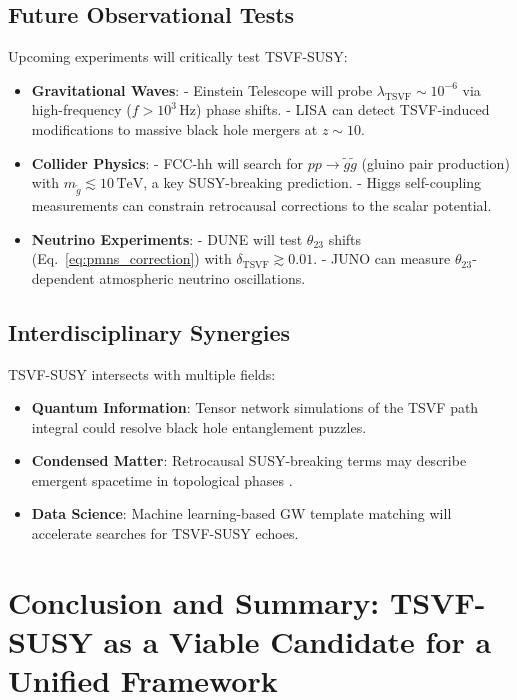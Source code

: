 \documentclass[twocolumn,superscriptaddress,floatfix]{revtex4-2}
\begin{document}
\subsection{Future Observational Tests}  
\label{subsec:future_obs}  

Upcoming experiments will critically test TSVF-SUSY:  
\begin{itemize}  
\item \textbf{Gravitational Waves}:  
  - Einstein Telescope \cite{Punturo2010} will probe \(\lambda_{\text{TSVF}} \sim 10^{-6}\) via high-frequency (\(f > 10^3 \, \text{Hz}\)) phase shifts.  
  - LISA \cite{Amaro-Seoane2017} can detect TSVF-induced modifications to massive black hole mergers at \(z \sim 10\).  
\item \textbf{Collider Physics}:  
  - FCC-hh \cite{Abada2019} will search for \(pp \to \tilde{g}\tilde{g}\) (gluino pair production) with \(m_{\tilde{g}} \lesssim 10 \, \text{TeV}\), a key SUSY-breaking prediction.  
  - Higgs self-coupling measurements \cite{deBlas2020} can constrain retrocausal corrections to the scalar potential.  
\item \textbf{Neutrino Experiments}:  
  - DUNE \cite{Abi2021} will test \(\theta_{23}\) shifts (Eq.~\ref{eq:pmns_correction}) with \(\delta_{\text{TSVF}} \gtrsim 0.01\).  
  - JUNO \cite{An2016} can measure \(\theta_{23}\)-dependent atmospheric neutrino oscillations.  
\end{itemize}  

\subsection{Interdisciplinary Synergies}  
\label{subsec:interdisciplinary}  

TSVF-SUSY intersects with multiple fields:  
\begin{itemize}  
\item \textbf{Quantum Information}: Tensor network simulations \cite{Swingle2012} of the TSVF path integral could resolve black hole entanglement puzzles.  
\item \textbf{Condensed Matter}: Retrocausal SUSY-breaking terms may describe emergent spacetime in topological phases \cite{Vishwanath2015}.  
\item \textbf{Data Science}: Machine learning-based GW template matching \cite{George2018} will accelerate searches for TSVF-SUSY echoes.  
\end{itemize}  

\section{Conclusion and Summary: TSVF-SUSY as a Viable Candidate for a Unified Framework}
\label{sec:conclusion}
\end{document}
